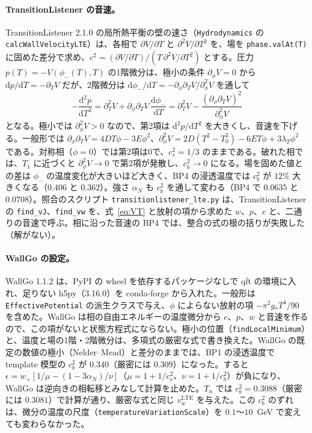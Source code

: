 \documentclass[a4paper,10pt]{ltjsarticle}
\newcommand{\dd}{\mathrm{d}}
\begin{document}
\paragraph{TransitionListener の音速。}TransitionListener 2.1.0 の局所熱平衡の壁の速さ（\texttt{Hydrodynamics} の \texttt{calcWallVelocityLTE}）は、各相で $\partial V/\partial T$ と $\partial^2V/\partial T^2$ を、場を \texttt{phase.valAt(T)} に固めた差分で求め、$c^2=(\partial V/\partial T)/(T\,\partial^2V/\partial T^2)$ とする。圧力 $p(T)=-V(\phi_-(T),T)$ の1階微分は、極小の条件 $\partial_\phi V=0$ から $\dd p/\dd T=-\partial_TV$ だが、2階微分は $\dd\phi_-/\dd T=-\partial_\phi\partial_TV/\partial_\phi^2V$ を通して
\begin{equation}
-\frac{\dd^2p}{\dd T^2}=\partial_T^2V+\partial_\phi\partial_TV\,\frac{\dd\phi_-}{\dd T}=\partial_T^2V-\frac{(\partial_\phi\partial_TV)^2}{\partial_\phi^2V}
\label{eq:cs2phase}
\end{equation}
となる。極小では $\partial_\phi^2V>0$ なので、第2項は $\dd^2p/\dd T^2$ を大きくし、音速を下げる。一般形では $\partial_\phi\partial_TV=4DT\phi-3E\phi^2$、$\partial_\phi^2V=2D(T^2-T_0^2)-6ET\phi+3\lambda_T\phi^2$ である。対称相（$\phi=0$）では第2項は0で、$c_s^2=1/3$ のままである。破れた相では、$T_1$ に近づくと $\partial_\phi^2V\to0$ で第2項が発散し、$c_b^2\to0$ になる。場を固めた値との差は $\phi_-$ の温度変化が大きいほど大きく、BP4 の浸透温度では $c_b^2$ が $12\%$ 大きくなる（$0.406$ と $0.362$）。強さ $\alpha_N$ も $c_b^2$ を通して変わる（BP4 で $0.0635$ と $0.0708$）。照合のスクリプト \texttt{transitionlistener\_lte.py} は、TransitionListener の \texttt{find\_vJ}、\texttt{find\_vw} を、式~\eqref{eq:VT} と放射の項から求めた $w$、$p$、$e$ と、二通りの音速で呼ぶ。相に沿った音速の BP4 では、整合の式の根の括りが失敗した（解がない）。

\paragraph{WallGo の設定。}WallGo 1.1.2 は、PyPI の wheel を依存するパッケージなしで qft の環境に入れ、足りない h5py（3.16.0）を conda-forge から入れた。一般形は \texttt{EffectivePotential} の派生クラスで与え、$\phi$ によらない放射の項 $-\pi^2g_*T^4/90$ を含めた。WallGo は相の自由エネルギーの温度微分から $e$、$p$、$w$ と音速を作るので、この項がないと状態方程式にならない。極小の位置（\texttt{findLocalMinimum}）と、温度と場の1階・2階微分は、多項式の厳密な式で書き換えた。WallGo の既定の数値の極小（Nelder--Mead）と差分のままでは、BP1 の浸透温度で template 模型の $c_b^2$ が $0.340$（厳密には $0.309$）になった。すると $\epsilon=w_+[1/\mu-(1-3\alpha_N)/\nu]$（$\mu=1+1/c_s^2$、$\nu=1+1/c_b^2$）が負になり、WallGo は逆向きの相転移とみなして計算を止めた。$T_n$ では $c_b^2=0.3088$（厳密には $0.3081$）で計算が通り、厳密な式と同じ $v_w^{\mathrm{LTE}}$ を与えた。この $c_b^2$ のずれは、微分の温度の尺度（\texttt{temperatureVariationScale}）を $0.1$〜$10$~GeV で変えても変わらなかった。
\end{document}
